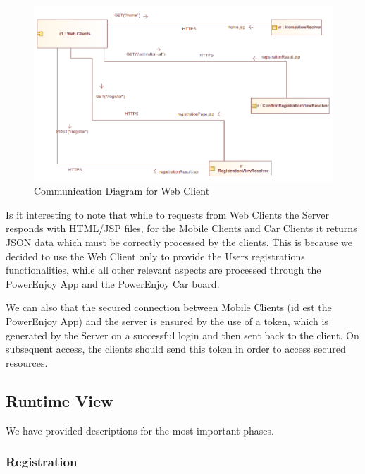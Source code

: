 \documentclass[12pt]{article}
\begin{document}
\FloatBarrier

\begin{figure}[h]
	\centering
	\includegraphics[width=\textwidth]{../Images/WebClient_Communication}
	\caption{Communication Diagram for Web Client}
\end{figure}

Is it interesting to note that while to requests from Web Clients the Server responds with HTML/JSP files, for the Mobile Clients and Car Clients it returns JSON data which must be correctly processed by the clients. This is because we decided to use the Web Client only to provide the Users registrations functionalities, while all other relevant aspects are processed through the PowerEnjoy App and the PowerEnjoy Car board.

We can also that the secured connection between Mobile Clients (id est the PowerEnjoy App) and the server is ensured by the use of a token, which is generated by the Server on a successful login and then sent back to the client. On subsequent access, the clients should send this token in order to access secured resources.
\clearpage
\subsection{Runtime View}
We have provided descriptions for the most important phases.
\subsubsection{Registration}
\end{document}
